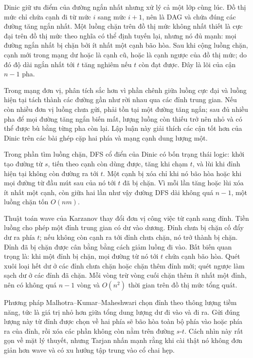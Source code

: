 \documentclass[11pt]{article}
\begin{document}
Dinic giữ ưu điểm của đường ngắn nhất nhưng xử lý cả một lớp cùng lúc. Đồ thị
mức chỉ chứa cạnh đi từ mức \(i\) sang mức \(i+1\), nên là DAG và chứa đúng các
đường tăng ngắn nhất. Một luồng chặn trên đồ thị mức không nhất thiết là cực đại
trên đồ thị mức theo nghĩa có thể định tuyến lại, nhưng nó đủ mạnh: mọi đường
ngắn nhất bị chặn bởi ít nhất một cạnh bão hòa. Sau khi cộng luồng chặn, cạnh mới
trong mạng dư hoặc là cạnh cũ, hoặc là cạnh ngược của đồ thị mức; do đó độ dài
ngắn nhất tới \(t\) tăng nghiêm nếu \(t\) còn đạt được. Đây là lõi của cận
\(n-1\) pha.

Trong mạng đơn vị, phân tích sắc hơn vì phần chênh giữa luồng cực đại và luồng
hiện tại tách thành các đường gần như rời nhau qua các đỉnh trung gian. Nếu còn
nhiều đơn vị luồng chưa gửi, phải tồn tại một đường tăng ngắn; sau đủ nhiều pha
để mọi đường tăng ngắn biến mất, lượng luồng còn thiếu trở nên nhỏ và có thể
được bù bằng từng pha còn lại. Lập luận này giải thích các cận tốt hơn của Dinic
trên các bài ghép cặp hai phía và mạng cạnh dung lượng một.

Trong phần tìm luồng chặn, DFS cổ điển của Dinic có bốn trạng thái logic:
khởi tạo đường từ \(s\), tiến theo cạnh còn dùng được, tăng khi chạm \(t\), và lùi
khi đỉnh hiện tại không còn đường ra tới \(t\). Một cạnh bị xóa chỉ khi nó bão hòa
hoặc khi mọi đường từ đầu mút sau của nó tới \(t\) đã bị chặn. Vì mỗi lần tăng
hoặc lùi xóa ít nhất một cạnh, còn giữa hai lần như vậy đường DFS dài không quá
\(n-1\), một luồng chặn tốn \(O(nm)\).

Thuật toán wave của Karzanov thay đổi đơn vị công việc từ cạnh sang đỉnh. Tiền
luồng cho phép một đỉnh trung gian có dư vào dương. Đỉnh chưa bị chặn cố đẩy dư
ra phía \(t\); nếu không còn cạnh ra tới đỉnh chưa chặn, nó trở thành bị chặn.
Đỉnh đã bị chặn được cân bằng bằng cách giảm luồng đi vào. Bất biến quan trọng
là: khi một đỉnh bị chặn, mọi đường từ nó tới \(t\) chứa cạnh bão hòa. Quét xuôi
loại hết dư ở các đỉnh chưa chặn hoặc chặn thêm đỉnh mới; quét ngược làm sạch dư
ở các đỉnh đã chặn. Mỗi vòng trừ vòng cuối chặn thêm ít nhất một đỉnh, nên có
không quá \(n-1\) vòng và \(O(n^2)\) thời gian trên đồ thị mức tổng quát.

Phương pháp Malhotra--Kumar--Maheshwari chọn đỉnh theo thông lượng tiềm năng,
tức là giá trị nhỏ hơn giữa tổng dung lượng dư đi vào và đi ra. Gửi đúng lượng này
từ đỉnh được chọn về hai phía sẽ bão hòa toàn bộ phía vào hoặc phía ra của đỉnh,
rồi xóa các phần không còn nằm trên đường \(s\)-\(t\). Cách nhìn này rất gọn về
mặt lý thuyết, nhưng Tarjan nhấn mạnh rằng khi cài thật nó không đơn giản hơn
wave và có xu hướng tập trung vào cổ chai hẹp.
\end{document}

